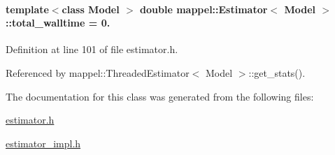 \paragraph[{\texorpdfstring{total\+\_\+walltime}{total_walltime}}]{\setlength{\rightskip}{0pt plus 5cm}template$<$class Model $>$ double {\bf mappel\+::\+Estimator}$<$ Model $>$\+::total\+\_\+walltime = 0.\hspace{0.3cm}{\ttfamily [protected]}}\hypertarget{classmappel_1_1Estimator_a5a408458a111c5222193871fa6bb6644}{}\label{classmappel_1_1Estimator_a5a408458a111c5222193871fa6bb6644}


Definition at line 101 of file estimator.\+h.



Referenced by mappel\+::\+Threaded\+Estimator$<$ Model $>$\+::get\+\_\+stats().



The documentation for this class was generated from the following files\+:\begin{DoxyCompactItemize}
\item 
\hyperlink{estimator_8h}{estimator.\+h}\item 
\hyperlink{estimator__impl_8h}{estimator\+\_\+impl.\+h}\end{DoxyCompactItemize}

